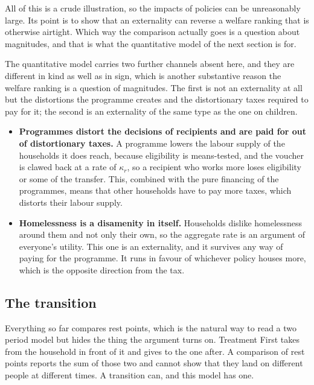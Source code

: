 \documentclass[10pt]{article}
\begin{document}
All of this is a crude illustration, so the impacts of
policies can be unreasonably large. Its point is to show that an
externality can reverse a welfare ranking that is
otherwise airtight. Which way the comparison actually
goes is a question about magnitudes, and that is what the quantitative model of
the next section is for.


The quantitative model carries two further channels absent here, and
they are different in kind as well as in sign, which is another substantive reason
the welfare ranking is a question of magnitudes. The first is not an externality at
all but the distortions the programme creates and the distortionary taxes
required to pay for it; the second is an externality of the
same type as the one on children.

\begin{itemize}\setlength{\itemsep}{0.15em}
\item \textbf{Programmes distort the decisions of recipients and are
paid for out of distortionary taxes.} A programme lowers the labour supply of the households it
does reach, because eligibility is means-tested, and the voucher is clawed back at a
rate of $\kappa_r$, so a recipient who works more loses eligibility or
some of the transfer.
This, combined with the pure financing of the programmes, means that other
households have to pay more taxes, which
distorts their labour supply.

\item \textbf{Homelessness is a disamenity in itself.} Households dislike
homelessness around them and not only their own, so the aggregate rate is an
argument of everyone's utility. This one is an externality, and it
survives any way of paying for the programme. It runs in favour of whichever policy houses
more, which is the opposite direction from the tax.
\end{itemize}



\subsection{The transition}\label{sec:trans}

Everything so far compares rest points, which is the natural way to read a
two period model but hides the thing the argument turns on. Treatment First takes
from the household in front of it and gives to the one after. A comparison of
rest points reports the sum of those two and cannot show that they land on
different people at different times. A transition can, and this model has one.
\end{document}
